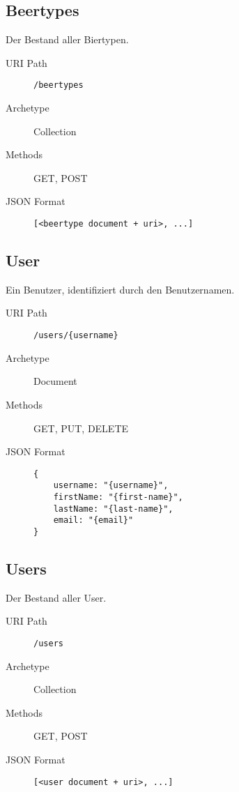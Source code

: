 \documentclass[10pt,a4paper]{scrartcl}
\begin{document}
\subsection{Beertypes}

Der Bestand aller Biertypen.

\begin{description}
	\item[URI Path] \texttt{/beertypes}
	\item[Archetype] Collection
	\item[Methods] GET, POST
	\item[JSON Format] \hfill
\begin{lstlisting}
[<beertype document + uri>, ...]
\end{lstlisting}
\end{description}


\subsection{User}

Ein Benutzer, identifiziert durch den Benutzernamen.

\begin{description}
	\item[URI Path] \texttt{/users/\{username\}}
	\item[Archetype] Document
	\item[Methods] GET, PUT, DELETE
	\item[JSON Format] \hfill
\begin{lstlisting}
{
	username: "{username}",
	firstName: "{first-name}",
	lastName: "{last-name}",
	email: "{email}"
}
\end{lstlisting}
\end{description}


\subsection{Users}

Der Bestand aller User.

\begin{description}
	\item[URI Path] \texttt{/users}
	\item[Archetype] Collection
	\item[Methods] GET, POST
	\item[JSON Format] \hfill
\begin{lstlisting}
[<user document + uri>, ...]
\end{lstlisting}
\end{description}
\end{document}
